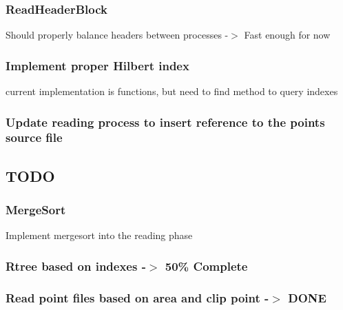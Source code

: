 \subsubsection*{Read\+Header\+Block}

Should properly balance headers between processes -\/$>$ Fast enough for now \subsubsection*{Implement proper Hilbert index}

current implementation is functions, but need to find method to query indexes

\subsubsection*{Update reading process to insert reference to the point\textquotesingle{}s source file}

\subsection*{T\+O\+D\+O}

\subsubsection*{Merge\+Sort}

Implement mergesort into the reading phase

\subsubsection*{Rtree based on indexes -\/$>$ 50\% Complete}

\subsubsection*{Read point files based on area and clip point -\/$>$ D\+O\+N\+E}